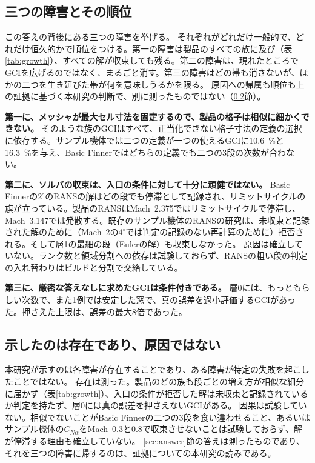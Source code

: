\documentclass[twocolumn]{labreport}
\newcommand{\CNa}{C_{N\alpha}}
\begin{document}
\subsection{三つの障害とその順位}
\label{sec:causes}

この答えの背後にある三つの障害を挙げる。
それぞれがどれだけ一般的で、どれだけ恒久的かで順位をつける。第一の障害は製品のすべての族に及び（表\ref{tab:growth}）、すべての解が収束しても残る。第二の障害は、現れたところでGCIを広げるのではなく、まるごと消す。第三の障害はどの帯も消さないが、ほかの二つを生き延びた帯が何を意味しうるかを限る。
原因への帰属も順位も上の証拠に基づく本研究の判断で、別に測ったものではない（\ref{sec:existence}節）。

\textbf{第一に、メッシャが最大セル寸法を固定するので、製品の格子は相似に細かくできない。}
そのような族のGCIはすべて、正当化できない格子寸法の定義の選択に依存する。サンプル機体では二つの定義が一つの使えるGCIに10.6~\%と16.3~\%を与え、Basic Finnerではどちらの定義でも二つの3段の次数が合わない。

\textbf{第二に、ソルバの収束は、入口の条件に対して十分に頑健ではない。}
Basic Finnerの$2^\circ$のRANSの解はどの段でも停滞として記録され、リミットサイクルの旗が立っている。製品のRANSはMach~2.375ではリミットサイクルで停滞し、Mach~3.147では発散する。既存のサンプル機体のRANSの研究は、未収束と記録された解のために（Mach~2の$4^\circ$では判定の記録のない再計算のために）拒否される。そして層1の最細の段（Eulerの解）も収束しなかった。
原因は確立していない。ランク数と領域分割への依存は試験しておらず、RANSの粗い段の判定の入れ替わりはビルドと分割で交絡している。

\textbf{第三に、厳密な答えなしに求めたGCIは条件付きである。}
層0には、もっともらしい次数で、また1例では安定した窓で、真の誤差を過小評価するGCIがあった。押さえた上限は、誤差の最大8倍であった。

\subsection{示したのは存在であり、原因ではない}
\label{sec:existence}

本研究が示すのは各障害が存在することであり、ある障害が特定の失敗を起こしたことではない。
存在は測った。製品のどの族も段ごとの増え方が相似な細分に届かず（表\ref{tab:growth}）、入口の条件が拒否した解は未収束と記録されているか判定を持たず、層0には真の誤差を押さえないGCIがある。
因果は試験していない。相似でないことがBasic Finnerの二つの3段を食い違わせること、あるいはサンプル機体の$\CNa$をMach~0.3と0.8で収束させないことは試験しておらず、解が停滞する理由も確立していない。
\ref{sec:answer}節の答えは測ったものであり、それを三つの障害に帰するのは、証拠についての本研究の読みである。
\end{document}
